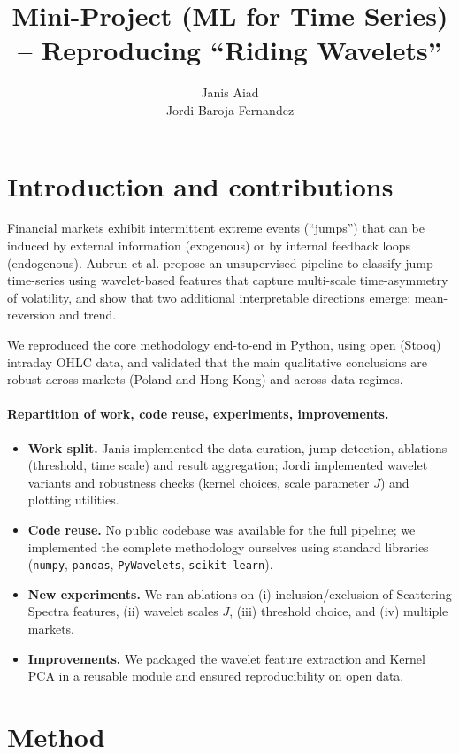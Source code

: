 \documentclass[10pt]{article}
\title{Mini-Project (ML for Time Series) -- Reproducing ``Riding Wavelets''}
\author{
Janis Aiad \email{janisaiad.ja@gmail.com} \\ %
Jordi Baroja Fernandez \email{baroja.jordi@gmail.com} %
}
\begin{document}
\maketitle

\section{Introduction and contributions}

Financial markets exhibit intermittent extreme events (``jumps'') that can be induced by external information (exogenous) or by internal feedback loops (endogenous). Aubrun et al. propose an unsupervised pipeline to classify jump time-series using wavelet-based features that capture multi-scale time-asymmetry of volatility, and show that two additional interpretable directions emerge: mean-reversion and trend.

We reproduced the core methodology end-to-end in Python, using open (Stooq) intraday OHLC data, and validated that the main qualitative conclusions are robust across markets (Poland and Hong Kong) and across data regimes.

\paragraph{Repartition of work, code reuse, experiments, improvements.}
\begin{itemize}
    \item \textbf{Work split.} Janis implemented the data curation, jump detection, ablations (threshold, time scale) and result aggregation; Jordi implemented wavelet variants and robustness checks (kernel choices, scale parameter $J$) and plotting utilities.
    \item \textbf{Code reuse.} No public codebase was available for the full pipeline; we implemented the complete methodology ourselves using standard libraries (\texttt{numpy}, \texttt{pandas}, \texttt{PyWavelets}, \texttt{scikit-learn}). 
    \item \textbf{New experiments.} We ran ablations on (i) inclusion/exclusion of Scattering Spectra features, (ii) wavelet scales $J$, (iii) threshold choice, and (iv) multiple markets.
    \item \textbf{Improvements.} We packaged the wavelet feature extraction and Kernel PCA in a reusable module and ensured reproducibility on open data.
\end{itemize}

\section{Method}
\end{document}

